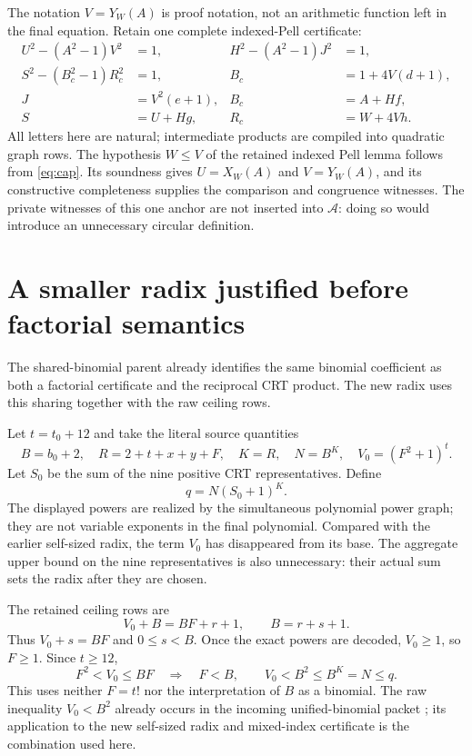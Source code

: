 \documentclass[11pt,letterpaper]{article}
\theoremstyle{remark}\newtheorem{remark}[theorem]{Remark}
\begin{document}
The notation $V=Y_W(A)$ is proof notation, not an arithmetic function
left in the final equation.  Retain one complete indexed-Pell certificate:
\begin{align*}
 U^2-(A^2-1)V^2&=1,& H^2-(A^2-1)J^2&=1,\\
 S^2-(B_c^2-1)R_c^2&=1,& B_c&=1+4V(d+1),\\
 J&=V^2(e+1),&B_c&=A+Hf,\\
 S&=U+Hg,&R_c&=W+4Vh.
\end{align*}
All letters here are natural; intermediate products are compiled into
quadratic graph rows.  The hypothesis $W\le V$ of the retained indexed
Pell lemma follows from \eqref{eq:cap}.  Its soundness gives
$U=X_W(A)$ and $V=Y_W(A)$, and its constructive completeness supplies
the comparison and congruence witnesses.  The private witnesses of this
one anchor are not inserted into $\mathcal A$: doing so would introduce
an unnecessary circular definition.

\section{A smaller radix justified before factorial semantics}

The shared-binomial parent already identifies the same binomial coefficient
as both a factorial certificate and the reciprocal CRT product.  The new
radix uses this sharing together with the raw ceiling rows.

Let $t=t_0+12$ and take the literal source quantities
\[
 B=b_0+2,\quad R=2+t+x+y+F,\quad K=R,\quad
 N=B^K,\quad V_0=(F^2+1)^t.
\]
Let $S_0$ be the sum of the nine positive CRT representatives.  Define
\begin{equation}\label{eq:radix}
 q=N(S_0+1)^K.
\end{equation}
The displayed powers are realized by the simultaneous polynomial
power graph; they are not variable exponents in the final polynomial.
Compared with the earlier self-sized radix, the term $V_0$ has disappeared
from its base.  The aggregate upper bound on the nine representatives is
also unnecessary: their actual sum sets the radix after they are chosen.

The retained ceiling rows are
\begin{equation}\label{eq:ceiling}
 V_0+B=BF+r+1,\qquad B=r+s+1.
\end{equation}
Thus $V_0+s=BF$ and $0\le s<B$.  Once the exact powers are decoded,
$V_0\ge1$, so $F\ge1$.  Since $t\ge12$,
\begin{equation}\label{eq:bootstrap}
 F^2<V_0\le BF\quad\Longrightarrow\quad F<B,
 \qquad V_0<B^2\le B^K=N\le q.
\end{equation}
This uses neither $F=t!$ nor the interpretation of $B$ as a binomial.
The raw inequality $V_0<B^2$ already occurs in the incoming unified-binomial
packet \cite{unified}; its application to the new self-sized radix and
mixed-index certificate is the combination used here.
\end{document}

